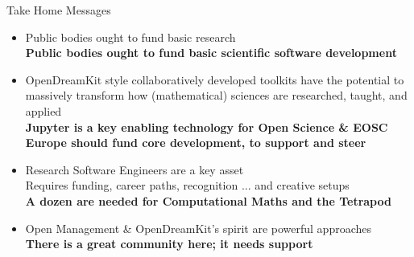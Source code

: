 \documentclass[svgnames]{beamer}
\begin{document}
\begin{frame}{Take Home Messages}
  \begin{itemize}
  \item Public bodies ought to fund basic research\pause\smallskip\\
    \textbf{\color{red}Public bodies ought to fund basic scientific software development}
    \medskip\pause

  \item OpenDreamKit style collaboratively developed toolkits have the
    potential to massively transform how (mathematical) sciences are
    researched, taught, and applied\\
    \smallskip\pause
    \textbf{\color{red}Jupyter is a key enabling technology for Open Science \& EOSC\\
      Europe should fund core development, to support and steer}
    \medskip\pause

  \item Research Software Engineers are a key asset\\
    Requires funding, career paths, recognition ... and creative setups\\
    \smallskip\pause
    \textbf{\color{red}A dozen are needed for Computational Maths and the Tetrapod}
    \medskip\pause

  \item Open Management \& OpenDreamKit's spirit are powerful approaches\\
    \pause\smallskip
    \textbf{\color{red}There is a great community here; it needs support}
  \end{itemize}
\end{frame}
\end{document}
